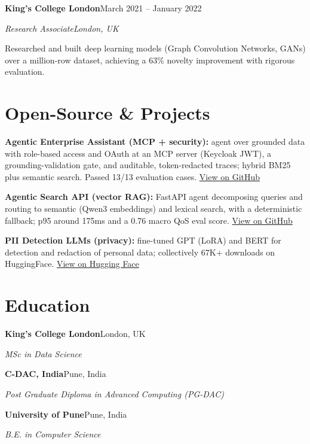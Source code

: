 \documentclass[10pt,a4paper]{article}
\newcommand{\entry}[4]{%
  {\color{company}\bfseries #1}\hfill {\color{muted}#2}\par
  \vspace{1pt}
  {\itshape #3}\hfill {\color{muted}\itshape #4}\par
  \vspace{3pt}%
}
\begin{document}
\entry{King's College London}{March 2021 -- January 2022}{Research Associate}{London, UK}
\begin{tight}
  \item Researched and built deep learning models (Graph Convolution Networks, GANs) over a million-row dataset, achieving a 63\% novelty improvement with rigorous evaluation.
\end{tight}

\section{Open-Source \& Projects}
\begin{tight}
  \item \textbf{Agentic Enterprise Assistant (MCP + security):} agent over grounded data with role-based access and OAuth at an MCP server (Keycloak JWT), a grounding-validation gate, and auditable, token-redacted traces; hybrid BM25 plus semantic search. Passed 13/13 evaluation cases. \href{https://github.com/abhijeetscode/Agentic-Enterprise-Assistant}{View on GitHub}
  \item \textbf{Agentic Search API (vector RAG):} FastAPI agent decomposing queries and routing to semantic (Qwen3 embeddings) and lexical search, with a deterministic fallback; p95 around 175ms and a 0.76 macro QoS eval score. \href{https://github.com/abhijeetscode/search-agent}{View on GitHub}
  \item \textbf{PII Detection LLMs (privacy):} fine-tuned GPT (LoRA) and BERT for detection and redaction of personal data; collectively 67K+ downloads on HuggingFace. \href{https://huggingface.co/ab-ai/pii_model}{View on Hugging Face}
\end{tight}

\section{Education}
{\color{company}\bfseries King's College London}\hfill {\color{muted}London, UK}\par
{\itshape MSc in Data Science}\par\vspace{2pt}
{\color{company}\bfseries C-DAC, India}\hfill {\color{muted}Pune, India}\par
{\itshape Post Graduate Diploma in Advanced Computing (PG-DAC)}\par\vspace{2pt}
{\color{company}\bfseries University of Pune}\hfill {\color{muted}Pune, India}\par
{\itshape B.E. in Computer Science}\par
\end{document}
